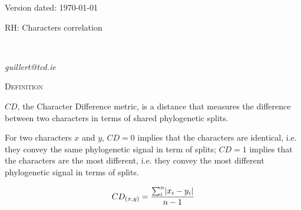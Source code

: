 \documentclass[12pt,letterpaper]{article}
\DeclarePairedDelimiter\abs{\lvert}{\rvert}%
\renewcommand{\section}[1]{%
\bigskip
\begin{center}
\begin{Large}
\normalfont\scshape #1
\medskip
\end{Large}
\end{center}}
\begin{document}
\begin{flushright}
Version dated: \today
\end{flushright}

\bigskip
\noindent RH: Characters correlation
\bigskip
\medskip
\begin{center}
\bigskip



\\

\end{center}
\medskip
{} \textit{guillert@tcd.ie}\\ 
\vspace{1in}

\newpage

\section{Definition}

$CD$, the Character Difference metric, is a distance that measures the difference between two characters in terms of shared phylogenetic splits.

For two characters $x$ and $y$, $CD=0$ implies that the characters are identical, i.e. they convey the same phylogenetic signal in term of splits; $CD=1$ implies that the characters are the most different, i.e. they convey the most different phylogenetic signal in terms of splits.

\begin{equation}
    CD_{(x,y)} = \frac{\sum_{i}^{n}\abs{x_{i} - y_{i}}}{n-1}
\end{equation}
\end{document}
